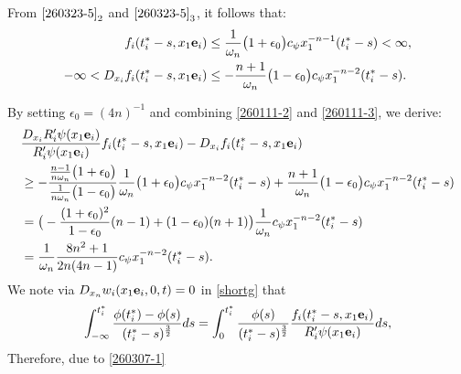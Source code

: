 \documentclass{amsart}
\numberwithin{equation}{section}
\newcommand{\ep}{{ \epsilon  }}
\newcommand{\om}{{ \omega  }}
\begin{document}
From $ \eqref{260323-5}_2$ and $ \eqref{260323-5}_3$, it follows that:
\begin{align}\label{260111-3}
\begin{split}
f_i (t^*_i -s, x_1 {\bf e}_i) & \leq   \frac1{\om_n} \big( 1  + \ep_0\big) c_\psi   x_1^{-n-1} (t_i^* -s)  < \infty,\\ 
-\infty< D_{x_i} f_i (t_i^* -s, x_1 {\bf e}_i) 
& \leq -      \frac{n+1}{\om_n} \big( 1 - \ep_0 \big)   c_\psi x_1^{-n-2} (t_i^* -s). 
\end{split}
\end{align}

By setting $\epsilon_0 = (4n)^{-1}$ and combining \eqref{260111-2} and \eqref{260111-3}, we derive:
\begin{align}\label{260307-1}
\begin{split}
& \frac{D_{x_i} R'_i \psi(x_1 {\bf e}_i)}{R'_i \psi (x_1 {\bf e}_i)} f_i (t_i^* -s, x_1 {\bf e}_i) - D_{x_i} f_i (t_i^* -s, x_1 {\bf e}_i) \\
& \geq  -  \frac{  \frac{n-1}{n \om_n }  \big( 1  +\ep_0   \big)  }{  \frac1{n \om_n}  \big(1 -\ep_0\big) }    \frac1{\om_n} \big( 1  + \ep_0\big) c_\psi   x_1^{-n-2} (t_i^* -s)
 +    \frac{n +1}{\om_n} \big( 1 - \ep_0 \big)   c_\psi x_1^{-n-2} (t_i^* -s)\\
 &  =  \big(  -\frac{(1 +\ep_0)^2}{1-\ep_0}  (n-1) + (1-\ep_0)(n+1) \big)  \frac1{\om_n}  c_\psi         x_1^{-n-2} (t_i^* -s)\\
  &  = \frac1{\om_n} \frac{8n^2 +1}{ 2n (4n-1)}   c_\psi        x_1^{-n-2} (t_i^* -s).
\end{split}
\end{align}
We note via $D_{x_n} w_i (x_1 {\bf e}_i, 0, t)=0$ in \eqref{shortg}  that
\begin{align*} 
\begin{split}
\int_{-\infty}^{t_i^*} \frac{\phi(t_i^*) -\phi(s)}{(t_i^* -s)^{\frac{3}{2}}} ds 
= \int_0^{t_i^*} \frac{\phi(s)}{(t_i^* -s)^{\frac{3}{2}}} \frac{f_i (t_i^* -s, x_1 {\bf e}_i)}{R'_i \psi (x_1 {\bf e}_i)} ds,
\end{split}
\end{align*}
Therefore,  due to \eqref{260307-1}
\end{document}
